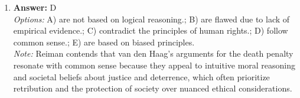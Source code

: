 \documentclass[12pt]{article}
\begin{document}
\begin{enumerate}[label=\arabic*.]
\\ \textit{Note:} Baier's ethical framework emphasizes the importance of considering the well-being and interests of all living beings in the formulation of genuine moral rules, advocating for a comprehensive moral perspective that includes all sentient entities.
\item \textbf{Answer:} D
\\ \textit{Options:} A) are not based on logical reasoning.; B) are flawed due to lack of empirical evidence.; C) contradict the principles of human rights.; D) follow common sense.; E) are based on biased principles.
\\ \textit{Note:} Reiman contends that van den Haag's arguments for the death penalty resonate with common sense because they appeal to intuitive moral reasoning and societal beliefs about justice and deterrence, which often prioritize retribution and the protection of society over nuanced ethical considerations.
\end{enumerate}
\end{document}
